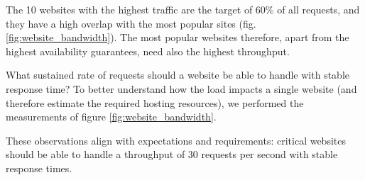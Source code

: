 The 10 websites with the highest traffic are the target of 60\% of all requests, and they have a high overlap with the most popular sites (fig. \ref{fig:website_bandwidth}).
The most popular websites therefore, apart from the highest availability guarantees, need also the highest throughput.

What sustained rate of requests should a website be able to handle with stable response time?
To better understand how the load impacts a single website (and therefore estimate the required hosting resources),
we performed the measurements of figure \ref{fig:website_bandwidth}.

These observations align with expectations and requirements: critical websites should be able to handle a throughput of 30 requests per second with stable response times.